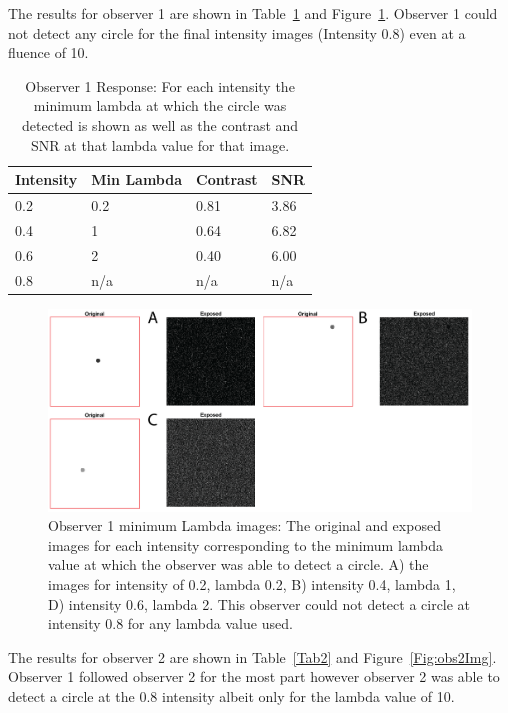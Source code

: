 \documentclass[12pt]{article}
\begin{document}
The results for observer 1 are shown in Table~\ref{Tab1} and Figure~\ref{Fig:obs1Img}. Observer 1 could not detect any circle for the final intensity images (Intensity 0.8) even at a fluence of 10. 
\begin{table}[H]
	\caption{Observer 1 Response: For each intensity the minimum lambda at which the circle was detected is shown as well as the contrast and SNR at that lambda value for that image.}
	\begin{tabular}{|l|l|l|l|}
		\hline
		Intensity & Min Lambda & Contrast & SNR  \\ \hline
		0.2       & 0.2        & 0.81     & 3.86 \\ \hline
		0.4       & 1          & 0.64     & 6.82 \\ \hline
		0.6       & 2          & 0.40     & 6.00 \\ \hline
		0.8       & n/a        & n/a      & n/a  \\ \hline
		
	\end{tabular}
\label{Tab1}
\end{table}

\begin{figure}[H]

\includegraphics[width=\textwidth]{Figures/Obs1_fig.png}
\caption{Observer 1 minimum Lambda images: The original and exposed images for each intensity corresponding to the minimum lambda value at which the observer was able to detect a circle. A) the images for intensity of 0.2, lambda 0.2, B) intensity 0.4, lambda 1, D) intensity 0.6, lambda 2. This observer could not detect a circle at intensity 0.8 for any lambda value used.}
\label{Fig:obs1Img}
\end{figure}

The results for observer 2 are shown in Table~\ref{Tab2} and Figure~\ref{Fig:obs2Img}. Observer 1 followed observer 2 for the most part however observer 2 was able to detect a circle at the 0.8 intensity albeit only for the lambda value of 10. 
\end{document}
